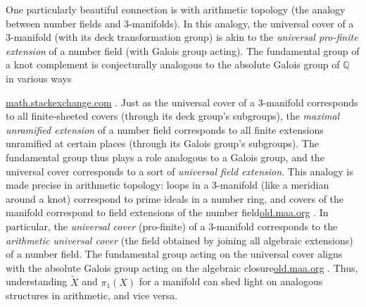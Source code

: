 \documentclass[11pt]{article}
\theoremstyle{remark}
\begin{document}
One particularly beautiful connection is with arithmetic topology (the analogy between number fields and 3-manifolds). In this analogy, the universal cover of a 3-manifold (with its deck transformation group) is akin to the \textit{universal pro-finite extension} of a number field (with Galois group acting). The fundamental group of a knot complement is conjecturally analogous to the absolute Galois group of $\mathbb{Q}$ in various ways

\href{https://math.stackexchange.com/questions/38936/analogies-between-prime-ideals-and-knots#:~:text=,between%20prime%20ideals%20and%20knots}{math.stackexchange.com}
. Just as the universal cover of a 3-manifold corresponds to all finite-sheeted covers (through its deck group’s subgroups), the \textit{maximal unramified extension} of a number field corresponds to all finite extensions unramified at certain places (through its Galois group’s subgroups). The fundamental group thus plays a role analogous to a Galois group, and the universal cover corresponds to a sort of \textit{universal field extension}. This analogy is made precise in arithmetic topology: loops in a 3-manifold (like a meridian around a knot) correspond to prime ideals in a number ring, and covers of the manifold correspond to field extensions of the number field\href{https://old.maa.org/press/maa-reviews/knots-and-primes-an-introduction-to-arithmetic-topology#:~:text=All%20right%2C%20then%2C%20what%20does,manifolds%20and%20%E2%80%9Cnumber%20rings.%E2%80%9D}{old.maa.org}
. In particular, the \textit{universal cover} (pro-finite) of a 3-manifold corresponds to the \textit{arithmetic universal cover} (the field obtained by joining all algebraic extensions) of a number field. The fundamental group acting on the universal cover aligns with the absolute Galois group acting on the algebraic closure\href{https://old.maa.org/press/maa-reviews/knots-and-primes-an-introduction-to-arithmetic-topology#:~:text=All%20right%2C%20then%2C%20what%20does,manifolds%20and%20%E2%80%9Cnumber%20rings.%E2%80%9D}{old.maa.org}
. Thus, understanding $\widetilde{X}$ and $\pi_1(X)$ for a manifold can shed light on analogous structures in arithmetic, and vice versa.
\end{document}
